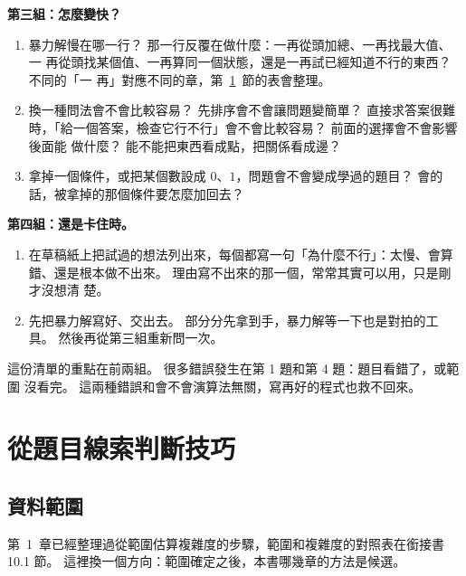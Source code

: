 \textbf{第三組：怎麼變快？}

\begin{enumerate}[resume]
\item 暴力解慢在哪一行？ 那一行反覆在做什麼：一再從頭加總、一再找最大值、一
再從頭找某個值、一再算同一個狀態，還是一再試已經知道不行的東西？ 不同的「一
再」對應不同的章，第~\ref{sec:cap-clues}~節的表會整理。
\item 換一種問法會不會比較容易？ 先排序會不會讓問題變簡單？ 直接求答案很難
時，「給一個答案，檢查它行不行」會不會比較容易？ 前面的選擇會不會影響後面能
做什麼？ 能不能把東西看成點，把關係看成邊？
\item 拿掉一個條件，或把某個數設成 $0$、$1$，問題會不會變成學過的題目？ 會的
話，被拿掉的那個條件要怎麼加回去？
\end{enumerate}

\textbf{第四組：還是卡住時。}

\begin{enumerate}[resume]
\item 在草稿紙上把試過的想法列出來，每個都寫一句「為什麼不行」：太慢、會算
錯、還是根本做不出來。 理由寫不出來的那一個，常常其實可以用，只是剛才沒想清
楚。
\item 先把暴力解寫好、交出去。 部分分先拿到手，暴力解等一下也是對拍的工具。
然後再從第三組重新問一次。
\end{enumerate}

這份清單的重點在前兩組。 很多錯誤發生在第 1 題和第 4 題：題目看錯了，或範圍
沒看完。 這兩種錯誤和會不會演算法無關，寫再好的程式也救不回來。

\section{從題目線索判斷技巧}
\label{sec:cap-clues}

\subsection{資料範圍}

第~1~章已經整理過從範圍估算複雜度的步驟，範圍和複雜度的對照表在銜接書 10.1
節。 這裡換一個方向：範圍確定之後，本書哪幾章的方法是候選。


